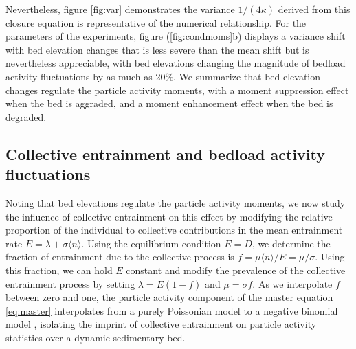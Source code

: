 \documentclass[draft]{agujournal2018}
\begin{document}
Nevertheless, figure \ref{fig:var} demonstrates the variance $1/(4\kappa)$ derived from this closure equation is representative of the numerical relationship.
For the parameters of the \citet{Ancey2008} experiments, figure (\ref{fig:condmoms}b) displays a variance shift with bed elevation changes that is less severe than the mean shift but is nevertheless appreciable, with bed elevations changing the magnitude of bedload activity fluctuations by as much as 20\%.
We summarize that bed elevation changes regulate the particle activity moments, with a moment suppression effect when the bed is aggraded, and a moment enhancement effect when the bed is degraded.

\subsection{Collective entrainment and bedload activity fluctuations}
\label{sec:colent}
Noting that bed elevations regulate the particle activity moments, we now study the influence of collective entrainment on this effect by modifying the relative proportion of the individual to collective contributions in the mean entrainment rate $E=\lambda + \sigma \langle n \rangle $.
Using the equilibrium condition $E=D$, we determine the fraction of entrainment due to the collective process is $f = \mu\langle n \rangle/E = \mu/\sigma$. Using this fraction, we can hold $E$ constant and modify the prevalence of the collective entrainment process by setting $\lambda = E(1-f)$ and $\mu= \sigma f$. As we interpolate $f$ between zero and one, the particle activity component of the master equation \ref{eq:master} interpolates from a purely Poissonian model \citep{Ancey2006} to a negative binomial model \citep{Ancey2008}, isolating the imprint of collective entrainment on particle activity statistics over a dynamic sedimentary bed.
\end{document}
